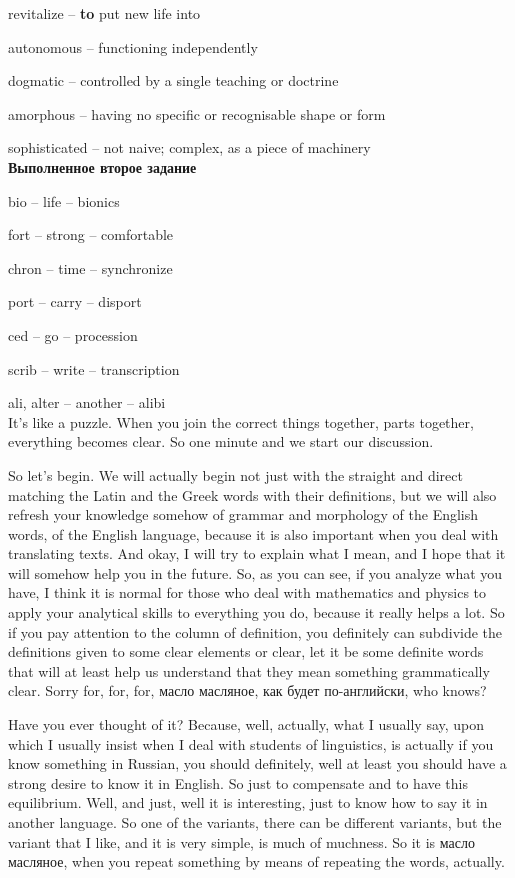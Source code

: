 \documentclass[main.tex]{subfiles}
\begin{document}
revitalize -- \textbf{to} put new life into

autonomous -- functioning independently

dogmatic -- controlled by a single teaching or doctrine

amorphous -- having no specific or recognisable shape or form

sophisticated -- not naive; complex, as a piece of machinery
\\

\textbf{Выполненное второе задание}

bio -- life -- bionics

fort -- strong -- comfortable

chron -- time -- synchronize

port -- carry -- disport

ced -- go -- procession

scrib -- write -- transcription

ali, alter -- another -- alibi
\\

It's like a puzzle.
When you join the correct things together, parts together, everything becomes clear.
So one minute and we start our discussion.

So let's begin.
We will actually begin not just with the straight and direct matching the Latin and the Greek words with their definitions, but we will also refresh your knowledge somehow of grammar and morphology of the English words, of the English language, because it is also important when you deal with translating texts.
And okay, I will try to explain what I mean, and I hope that it will somehow help you in the future.
So, as you can see, if you analyze what you have, I think it is normal for those who deal with mathematics and physics to apply your analytical skills to everything you do, because it really helps a lot.
So if you pay attention to the column of definition, you definitely can subdivide the definitions given to some clear elements or clear, let it be some definite words that will at least help us understand that they mean something grammatically clear.
Sorry for, for, for, масло масляное, как будет по-английски, who knows?

Have you ever thought of it?
Because, well, actually, what I usually say, upon which I usually insist when I deal with students of linguistics, is actually if you know something in Russian, you should definitely, well at least you should have a strong desire to know it in English.
So just to compensate and to have this equilibrium.
Well, and just, well it is interesting, just to know how to say it in another language.
So one of the variants, there can be different variants, but the variant that I like, and it is very simple, is much of muchness.
So it is масло масляное, when you repeat something by means of repeating the words, actually.
\end{document}
